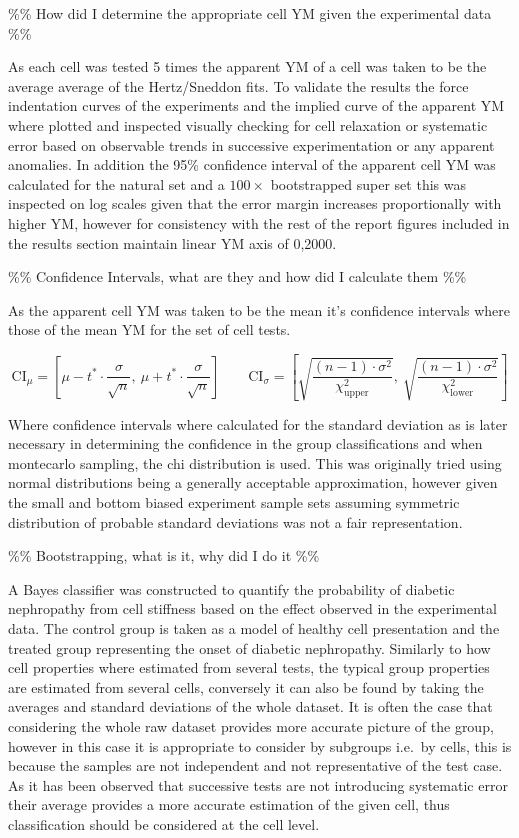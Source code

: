 \documentclass[
  paper=a4,
  ,captions=tableheading
]{scrartcl}
\begin{document}
\%\% How did I determine the appropriate cell YM given the experimental
data \%\%

As each cell was tested 5 times the apparent YM of a cell was taken to
be the average average of the Hertz/Sneddon fits. To validate the
results the force indentation curves of the experiments and the implied
curve of the apparent YM where plotted and inspected visually checking
for cell relaxation or systematic error based on observable trends in
successive experimentation or any apparent anomalies. In addition the
95\% confidence interval of the apparent cell YM was calculated for the
natural set and a \(100 \times\) bootstrapped super set this was
inspected on log scales given that the error margin increases
proportionally with higher YM, however for consistency with the rest of
the report figures included in the results section maintain linear YM
axis of 0,2000.

\%\% Confidence Intervals, what are they and how did I calculate them
\%\%

As the apparent cell YM was taken to be the mean it's confidence
intervals where those of the mean YM for the set of cell tests.

\[\text{CI}_\mu = \left[ \mu - t^* \cdot \frac{\sigma}{\sqrt{n}},\ \mu + t^* \cdot \frac{\sigma}{\sqrt{n}} \right]
\qquad
\text{CI}_\sigma = \left[ \sqrt{ \frac{(n-1) \cdot \sigma^2}{\chi^2_{\text{upper}}} },\ \sqrt{ \frac{(n-1) \cdot \sigma^2}{\chi^2_{\text{lower}}} } \right]
\]

Where confidence intervals where calculated for the standard deviation
as is later necessary in determining the confidence in the group
classifications and when montecarlo sampling, the chi distribution is
used. This was originally tried using normal distributions being a
generally acceptable approximation, however given the small and bottom
biased experiment sample sets assuming symmetric distribution of
probable standard deviations was not a fair representation.

\%\% Bootstrapping, what is it, why did I do it \%\%

A Bayes classifier was constructed to quantify the probability of
diabetic nephropathy from cell stiffness based on the effect observed in
the experimental data. The control group is taken as a model of healthy
cell presentation and the treated group representing the onset of
diabetic nephropathy. Similarly to how cell properties where estimated
from several tests, the typical group properties are estimated from
several cells, conversely it can also be found by taking the averages
and standard deviations of the whole dataset. It is often the case that
considering the whole raw dataset provides more accurate picture of the
group, however in this case it is appropriate to consider by subgroups
i.e.~by cells, this is because the samples are not independent and not
representative of the test case. As it has been observed that successive
tests are not introducing systematic error their average provides a more
accurate estimation of the given cell, thus classification should be
considered at the cell level.
\end{document}
